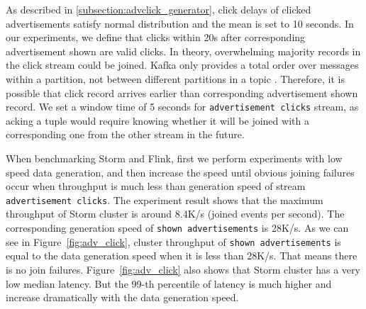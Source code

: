 As described in \cref{subsection:advclick_generator}, click delays of clicked advertisements satisfy normal distribution and the mean is set to 10 seconds. In our experiments, we define that clicks within 20s after corresponding advertisement shown are valid clicks. In theory, overwhelming majority records in the click stream could be joined. Kafka only provides a total order over messages within a partition, not between different partitions in a topic \cite{Kafka}. Therefore, it is possible that click record arrives earlier than corresponding advertisement shown record. We set a window time of 5 seconds for \texttt{advertisement clicks} stream, as acking a tuple would require knowing whether it will be joined with a corresponding one from the other stream in the future.

When benchmarking Storm and Flink, first we perform experiments with low speed data generation, and then increase the speed until obvious joining failures occur when throughput is much less than generation speed of stream \texttt{advertisement clicks}. The experiment result shows that the maximum throughput of Storm cluster is around 8.4K/s (joined events per second). The corresponding generation speed of \texttt{shown advertisements} is 28K/s. As we can see in Figure~\ref{fig:adv_click}, cluster throughput of  \texttt{shown advertisements} is equal to the data generation speed  when it is less than 28K/s. That means there is no join failures. Figure~\ref{fig:adv_click} also shows that Storm cluster has a very low median latency. But the 99-th percentile of latency is much higher and increase dramatically with the data generation speed.



